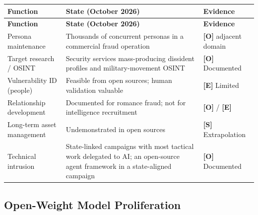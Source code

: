 \documentclass[11pt,letterpaper]{article}
\begin{document}
{\small
\begin{longtable}{L{3.6cm}L{6.4cm}L{2.8cm}}
\toprule
\textbf{Function} & \textbf{State (October 2026)} & \textbf{Evidence} \\
\midrule
\endfirsthead
\toprule
\textbf{Function} & \textbf{State (October 2026)} & \textbf{Evidence} \\
\midrule
\endhead
Persona maintenance & Thousands of concurrent personas in a commercial fraud operation & \textbf{[O]} adjacent domain \\*
Target research / OSINT & Security services mass-producing dissident profiles and military-movement OSINT & \textbf{[O]} Documented \\
Vulnerability ID (people) & Feasible from open sources; human validation valuable & \textbf{[E]} Limited \\
Relationship development & Documented for romance fraud; not for intelligence recruitment & \textbf{[O]} / \textbf{[E]} \\
Long-term asset management & Undemonstrated in open sources & \textbf{[S]} Extrapolation \\*
Technical intrusion & State-linked campaigns with most tactical work delegated to AI; an open-source agent framework in a state-aligned campaign & \textbf{[O]} Documented \\
\bottomrule
\end{longtable}}

\subsection{Open-Weight Model Proliferation}
\end{document}
